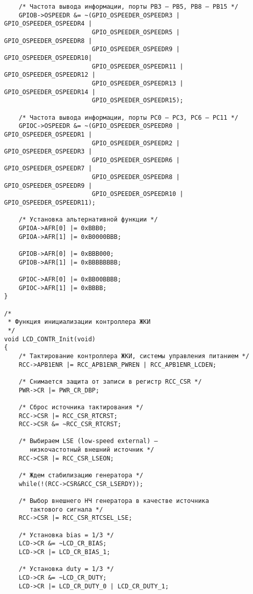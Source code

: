 \begin{verbatim}
    /* Частота вывода информации, порты PB3 – PB5, PB8 – PB15 */
    GPIOB->OSPEEDR &= ~(GPIO_OSPEEDER_OSPEEDR3 | GPIO_OSPEEDER_OSPEEDR4 | 
                        GPIO_OSPEEDER_OSPEEDR5 | GPIO_OSPEEDER_OSPEEDR8 | 
                        GPIO_OSPEEDER_OSPEEDR9 | GPIO_OSPEEDER_OSPEEDR10| 
                        GPIO_OSPEEDER_OSPEEDR11 | GPIO_OSPEEDER_OSPEEDR12 |
                        GPIO_OSPEEDER_OSPEEDR13 | GPIO_OSPEEDER_OSPEEDR14 | 
                        GPIO_OSPEEDER_OSPEEDR15);

    /* Частота вывода информации, порты PC0 – PC3, PC6 – PC11 */
    GPIOC->OSPEEDR &= ~(GPIO_OSPEEDER_OSPEEDR0 | GPIO_OSPEEDER_OSPEEDR1 | 
                        GPIO_OSPEEDER_OSPEEDR2 | GPIO_OSPEEDER_OSPEEDR3 |
                        GPIO_OSPEEDER_OSPEEDR6 | GPIO_OSPEEDER_OSPEEDR7 | 
                        GPIO_OSPEEDER_OSPEEDR8 | GPIO_OSPEEDER_OSPEEDR9 |  
                        GPIO_OSPEEDER_OSPEEDR10 | GPIO_OSPEEDER_OSPEEDR11);

    /* Установка альтернативной функции */
    GPIOA->AFR[0] |= 0xBBB0;
    GPIOA->AFR[1] |= 0xB0000BBB;

    GPIOB->AFR[0] |= 0xBBB000;
    GPIOB->AFR[1] |= 0xBBBBBBBB;

    GPIOC->AFR[0] |= 0xBB00BBBB;
    GPIOC->AFR[1] |= 0xBBBB;
}

/*
 * Функция инициализации контроллера ЖКИ
 */
void LCD_CONTR_Init(void)
{
    /* Тактирование контроллера ЖКИ, системы управления питанием */
    RCC->APB1ENR |= RCC_APB1ENR_PWREN | RCC_APB1ENR_LCDEN;

    /* Снимается защита от записи в регистр RCC_CSR */
    PWR->CR |= PWR_CR_DBP;

    /* Сброс источника тактирования */
    RCC->CSR |= RCC_CSR_RTCRST;
    RCC->CSR &= ~RCC_CSR_RTCRST;

    /* Выбираем LSE (low-speed external) — 
       низкочастотный внешний источник */
    RCC->CSR |= RCC_CSR_LSEON;

    /* Ждем стабилизацию генератора */
    while(!(RCC->CSR&RCC_CSR_LSERDY));

    /* Выбор внешнего НЧ генератора в качестве источника 
       тактового сигнала */
    RCC->CSR |= RCC_CSR_RTCSEL_LSE;

    /* Установка bias = 1/3 */
    LCD->CR &= ~LCD_CR_BIAS;
    LCD->CR |= LCD_CR_BIAS_1;

    /* Установка duty = 1/3 */
    LCD->CR &= ~LCD_CR_DUTY;
    LCD->CR |= LCD_CR_DUTY_0 | LCD_CR_DUTY_1;


\end{verbatim}
